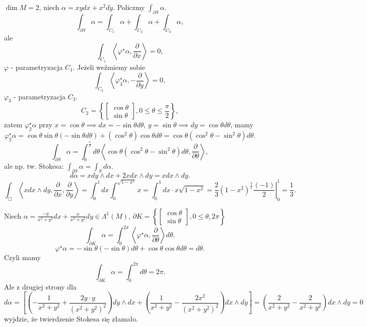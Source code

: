 \documentclass[../main.tex]{subfiles}
\begin{document}
\begin{przyklad}
    $\dim M = 2$, niech $\alpha = xydx + x^2dy$. Policzmy $\int_{\partial S}\alpha$.
    \[
    \int_{\partial S}\alpha = \int_{C_1}\alpha + \int_{C_2}\alpha + \int_{C_3}\alpha
    ,\]
ale
    \[
        \int_{C_1}\left<\varphi^\star\alpha, \frac{\partial }{\partial x}  \right> = 0
    ,\]
$\varphi$ - parametryzacja $C_1$. Jeżeli weźmiemy sobie
\[
\int_{C_3}\left<\varphi_3^\star\alpha, - \frac{\partial }{\partial y}  \right> = 0
,\]
$\varphi_3$ - parametryzacja $C_3$.
\[
    C_2 = \left\{ \begin{bmatrix} \cos\theta\\ \sin\theta \end{bmatrix}, 0\le \theta \le \frac{\pi}{2}  \right\}
,\]
zatem $\varphi_2^\star\alpha$ przy $x = \cos\theta \implies dx = -\sin\theta d\theta$, $y = \sin\theta \implies dy = \cos\theta d\theta$, mamy
\[
    \varphi_2^\star \alpha = \cos\theta \sin\theta(-\sin\theta d\theta) + (\cos^2\theta)\cos\theta d\theta = \cos\theta(\cos^2\theta - \sin^2\theta)d\theta
.\]
\[
    \int_{\partial S}\alpha = \int_0^{\frac{\pi}{2}}d\theta \left<\cos\theta(\cos^2\theta - \sin^2\theta)d\theta, \frac{\partial }{\partial \theta}  \right>
,\]
ale np. tw. Stokesa: $\int_{\partial S}\alpha = \int_S d\alpha$.
\[
d\alpha = xdy\land dx + 2xdx\land dy = xdx\land dy
.\]
\[
    \int_{\Box}\left<xdx\land dy, \frac{\partial }{\partial x} , \frac{\partial }{\partial y}  \right> = \int_0^1dx\int_0^{\sqrt{1-x^2} } x = \int_0^1dx \cdot x\sqrt{1-x^2} = \left.\frac{2}{3}(1-x^2)^{\frac{3}{2}}\frac{(-1)}{2}\right|_0^1 = \frac{1}{3}
.\]
\end{przyklad}
\begin{przyklad}
    Niech $\alpha = \frac{-y}{x^2+y^2}dx + \frac{x}{x^2+y^2}dy\in \Lambda^1(M)$, $\partial K = \left\{ \begin{bmatrix} \cos\theta\\ \sin\theta \end{bmatrix} , 0\le \theta, 2\pi \right\} $
    \[
        \int_{\partial K}\alpha = \int_0^{2\pi}\left<\varphi^\star\alpha, \frac{\partial }{\partial \theta} \right>d\theta
    .\]
\[
    \varphi^\star \alpha = -\sin\theta(-\sin\theta)d\theta + \cos\theta\cos\theta d\theta = d\theta
.\]
Czyli mamy
\[
\int_{\partial K}\alpha = \int_0^{2\pi}d\theta = 2\pi
.\]
Ale z drugiej strony dla
    \[
        d\alpha = \left[ \left( -\frac{1}{x^2+y^2} + \frac{2y\cdot y}{(x^2+y^2)^2} \right) dy\land dx + \left( \frac{1}{x^2+y^2} - \frac{2x^2}{(x^2+y^2)^2} \right) dx\land dy \right] = \left( \frac{2}{x^2 + y^2} - \frac{2}{x^2+y^2} \right) dx\land dy = 0
    \] wyjdzie, że twierdzenie Stokesa się złamało.
\end{przyklad}
\end{document}
